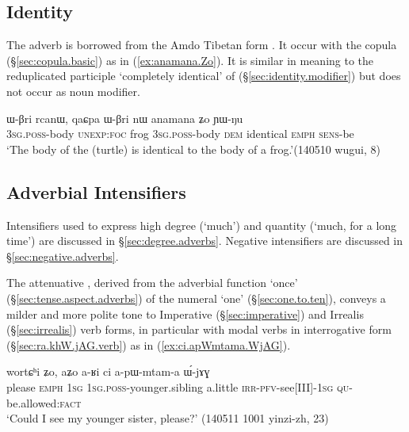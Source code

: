 \subsection{Identity} \label{sec:identity.adverbs}
The adverb  is borrowed from the Amdo Tibetan form . It occur with the copula  (§\ref{sec:copula.basic}) as in (\ref{ex:anamana.Zo}). It is similar in meaning to the reduplicated participle  `completely identical' of  (§\ref{sec:identity.modifier}) but does not occur as noun modifier. 

\begin{exe}
\ex \label{ex:anamana.Zo}
 \gll ɯ-βri rcanɯ, qaɕpa ɯ-βri nɯ anamana ʑo ɲɯ-ŋu \\
 \textsc{3sg}.\textsc{poss}-body \textsc{unexp}:\textsc{foc} frog  \textsc{3sg}.\textsc{poss}-body \textsc{dem} identical \textsc{emph} \textsc{sens}-be \\
\glt `The body of the (turtle) is identical to the body of a frog.'(140510 wugui, 8)
\end{exe}

\subsection{Adverbial Intensifiers} \label{sec:intensifier.adverbs}
Intensifiers used to express high degree (`much') and quantity (`much, for a long time') are discussed in §\ref{sec:degree.adverbs}. Negative intensifiers are discussed in §\ref{sec:negative.adverbs}.

The attenuative , derived from the adverbial function `once' (§\ref{sec:tense.aspect.adverbs}) of the numeral  `one' (§\ref{sec:one.to.ten}),  conveys a milder and more polite tone to Imperative (§\ref{sec:imperative}) and Irrealis (§\ref{sec:irrealis}) verb forms, in particular with modal verbs in interrogative form (§\ref{sec:ra.khW.jAG.verb}) as in (\ref{ex:ci.apWmtama.WjAG}).

 \begin{exe}
\ex \label{ex:ci.apWmtama.WjAG}
\gll wortɕʰi ʑo, aʑo a-ʁi ci a-pɯ-mtam-a ɯ́-jɤɣ \\
please \textsc{emph} \textsc{1sg} \textsc{1sg}.\textsc{poss}-younger.sibling a.little \textsc{irr}-\textsc{pfv}-see[III]-\textsc{1sg} \textsc{qu}-be.allowed:\textsc{fact} \\
\glt  `Could I see my younger sister, please?' (140511 1001 yinzi-zh, 23)
 \end{exe} 
 
